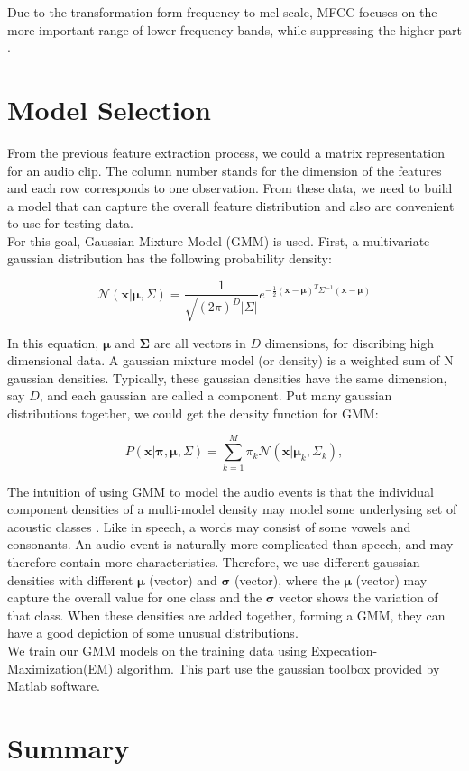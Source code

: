
Due to the transformation form frequency to mel scale, MFCC focuses on the more important range of lower frequency bands, while suppressing the higher part \parencite{davis1980comparison}.

\section{Model Selection}
From the previous feature extraction process, we could a matrix representation for an audio clip. 
The column number stands for the dimension of the features and each row corresponds to one observation. 
From these data, we need to build a model that can capture the overall feature distribution and also are convenient to use for testing data.\\

For this goal, Gaussian Mixture Model (GMM) is used. 
First, a multivariate gaussian distribution has the following probability density:

\begin{equation}
 \mathcal{N}(\mathbf{x}| \mathbf{\mu}, \Sigma) = 
\frac{1}{\sqrt{(2\pi)^D|\Sigma|}}e^{-\frac{1}{2}(\mathbf{x}-\mathbf{\mu})^T \Sigma^{-1} (\mathbf{x}-\mathbf{\mu})}
\end{equation}

In this equation, $\mathbf{\mu}$ and $\mathbf{\Sigma}$ are all vectors in $D$ dimensions, for discribing high dimensional data. 
A gaussian mixture model (or density) is a weighted sum of N gaussian densities. 
Typically, these gaussian densities have the same dimension, say $D$, and each gaussian are called a component.  
Put many gaussian distributions together, we could get the density function for GMM: 

\begin{equation}
P(\mathbf{x}|\mathbf{\pi},\mathbf{\mu},\Sigma) = \sum_{k = 1}^{M} \pi_k
\mathcal{N}(\mathbf{x}|\mathbf{\mu}_k, \Sigma_k),
\end{equation} 

The intuition of using GMM to model the audio events is that the individual component densities of a multi-model density may model some underlysing set of acoustic classes \parencite{reynolds1995robust}. 
Like in speech, a words may consist of some vowels and consonants. 
An audio event is naturally more complicated than speech, and may therefore contain more characteristics. 
Therefore, we use different gaussian densities with different $\mathbf{\mu}$ (vector) and $\mathbf\sigma$ (vector), where the $\mathbf\mu$ (vector) may capture the overall value for one class and the $\mathbf\sigma$ vector shows the variation of that class.  
When these densities are added together, forming a GMM, they can have a good depiction of some unusual distributions. \\ 

We train our GMM models on the training data using Expecation-Maximization(EM) algorithm. 
This part use the gaussian toolbox provided by Matlab software. 

\section{Summary}


